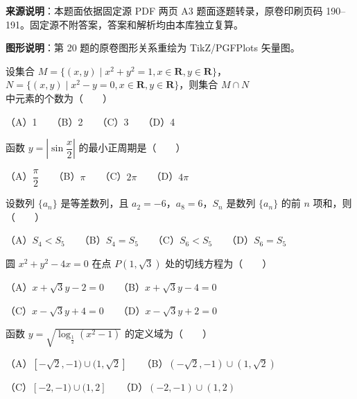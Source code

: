 

\begin{gktip}
\textbf{来源说明}：本题面依据固定源 PDF 两页 A3 题面逐题转录，原卷印刷页码 190–191。固定源不附答案，答案和解析均由本库独立复算。

\textbf{图形说明}：第 20 题的原卷图形关系重绘为 TikZ/PGFPlots 矢量图。
\end{gktip}


\begin{question}
设集合 $M=\{(x,y)\mid x^2+y^2=1,x\in\mathbf{R},y\in\mathbf{R}\}$，$N=\{(x,y)\mid x^2-y=0,x\in\mathbf{R},y\in\mathbf{R}\}$，则集合 $M\cap N$ 中元素的个数为\mbox{（　　）}

（A）1　　（B）2　　（C）3　　（D）4

\end{question}
\begin{question}
函数 $y=\left|\sin\dfrac{x}{2}\right|$ 的最小正周期是\mbox{（　　）}

（A）$\dfrac{\pi}{2}$　　（B）$\pi$　　（C）$2\pi$　　（D）$4\pi$

\end{question}
\begin{question}
设数列 $\{a_n\}$ 是等差数列，且 $a_2=-6$，$a_8=6$，$S_n$ 是数列 $\{a_n\}$ 的前 $n$ 项和，则\mbox{（　　）}

（A）$S_4<S_5$　　（B）$S_4=S_5$　　（C）$S_6<S_5$　　（D）$S_6=S_5$

\end{question}
\begin{question}
圆 $x^2+y^2-4x=0$ 在点 $P(1,\sqrt{3})$ 处的切线方程为\mbox{（　　）}

（A）$x+\sqrt{3}y-2=0$　　（B）$x+\sqrt{3}y-4=0$

（C）$x-\sqrt{3}y+4=0$　　（D）$x-\sqrt{3}y+2=0$

\end{question}
\begin{question}
函数 $y=\sqrt{\log_{\frac{1}{2}}(x^2-1)}$ 的定义域为\mbox{（　　）}

（A）$[-\sqrt{2},-1)\cup(1,\sqrt{2}]$　　（B）$(-\sqrt{2},-1)\cup(1,\sqrt{2})$

（C）$[-2,-1)\cup(1,2]$　　（D）$(-2,-1)\cup(1,2)$

\end{question}

